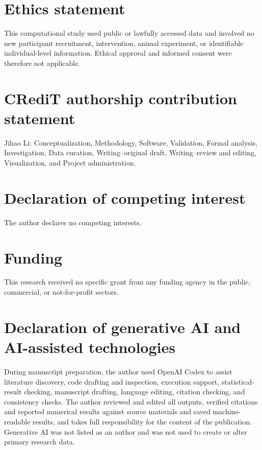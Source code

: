 \documentclass[10pt]{article}
\begin{document}
\section*{Ethics statement}

This computational study used public or lawfully accessed data and involved no new participant recruitment, intervention, animal experiment, or identifiable individual-level information. Ethical approval and informed consent were therefore not applicable.

\section*{CRediT authorship contribution statement}

Jihao Li: Conceptualization, Methodology, Software, Validation, Formal analysis, Investigation, Data curation, Writing--original draft, Writing--review and editing, Visualization, and Project administration.

\section*{Declaration of competing interest}

The author declares no competing interests.

\section*{Funding}

This research received no specific grant from any funding agency in the public, commercial, or not-for-profit sectors.

\section*{Declaration of generative AI and AI-assisted technologies}

During manuscript preparation, the author used OpenAI Codex to assist literature discovery, code drafting and inspection, execution support, statistical-result checking, manuscript drafting, language editing, citation checking, and consistency checks. The author reviewed and edited all outputs, verified citations and reported numerical results against source materials and saved machine-readable results, and takes full responsibility for the content of the publication. Generative AI was not listed as an author and was not used to create or alter primary research data.
\end{document}
